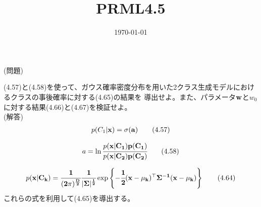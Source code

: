 \documentclass{jsarticle}
\title{PRML4.5}
\date{\today}
\begin{document}
\maketitle

(問題)

(4.57)と(4.58)を使って、ガウス確率密度分布を用いた2クラス生成モデルにおけるクラスの事後確率に対する(4.65)の結果を
導出せよ。また、パラメータ$\bf w$と$w_0$に対する結果(4.66)と(4.67)を検証せよ。
\\

(解答)
\begin{align*}
    p(C_1 | \bf x) = \sigma (a) \tag{4.57}
\end{align*}

\begin{align*}
    a = \ln \cfrac{p(\bf x | C_1)p(C_1)}{p(\bf x | C_2)p(C_2)} \tag{4.58}
\end{align*}

\begin{align*}
    p(\bf x|C_k) = \cfrac{1}{(2 \pi)^{\frac{D}{2}}} \cfrac{1}{|\Sigma|^{\frac{1}{2}}} \exp \left\{ -\cfrac{1}{2} (\bf x - \bf{\mu}_k)^\top \Sigma^{-1} (\bf x - \bf \mu_k) \right\} \tag{4.64}
\end{align*}
これらの式を利用して(4.65)を導出する。
\end{document}
